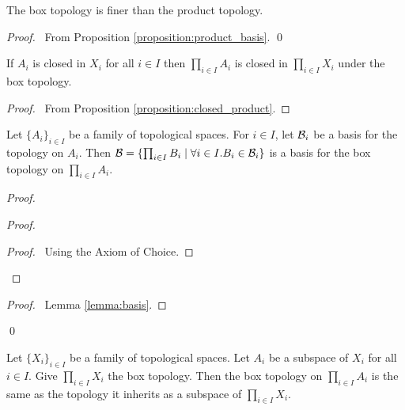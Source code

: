 \begin{proposition}
    The box topology is finer than the product topology.
\end{proposition}

\begin{proof}
    \pf\ From Proposition \ref{proposition:product_basis}. \qed
\end{proof}

\begin{corollary}
    \label{corollary:closed_box}
        If $A_i$ is closed in $X_i$ for all $i \in I$ then $\prod_{i \in I} A_i$ is closed in $\prod_{i \in I} X_i$ under the box topology.    
\end{corollary}

\begin{proof}
    \pf\ From Proposition \ref{proposition:closed_product}.
\end{proof}

\begin{proposition}[AC]
    Let $\{ A_i \}_{i \in I}$ be a family of topological spaces. For $i \in I$, let $\mathcal{B}_i$ be a basis for the topology on $A_i$. Then $\mathcal{B} = \{ \prod_{i \in I} B_i \mid
    \forall i \in I. B_i \in \mathcal{B}_i \}$ is a basis for the box topology on $\prod_{i \in I} A_i$.
\end{proposition}

\begin{proof}
    \pf
    \begin{proof}
        \begin{proof}
            \pf\ Using the Axiom of Choice.
        \end{proof}
    \end{proof}
    \qedstep
    \begin{proof}
        \pf\ Lemma \ref{lemma:basis}.
    \end{proof}
    \qed
\end{proof}

\begin{theorem}
    Let $\{ X_i \}_{i \in I}$ be a family of topological spaces. Let $A_i$ be a subspace of $X_i$ for all $i \in I$.
    Give $\prod_{i \in I} X_i$ the box topology.
    Then the box topology on $\prod_{i \in I} A_i$ is the same as the topology it inherits as a subspace of
    $\prod_{i \in I} X_i$.
\end{theorem}

